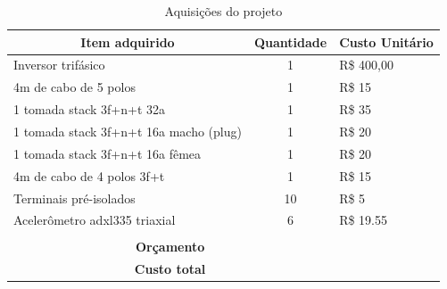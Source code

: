 \begin{table}[H]
\centering
\caption{Aquisições do projeto}
\label{tab:acompanhamento_custos}
\begin{tabular}{|l|c|l|}
\hline
\multicolumn{1}{|c|}{\textbf{Item adquirido}} & \textbf{Quantidade} & \multicolumn{1}{c|}{\textbf{Custo Unitário}} \\ \hline
Inversor trifásico                            & 1                   & R\$ 400,00                                   \\ \hline
4m de cabo de 5 polos                         & 1                   & R\$ 15                                       \\ \hline
1 tomada stack 3f+n+t 32a                     & 1                   & R\$ 35                                       \\ \hline
1 tomada stack 3f+n+t 16a macho (plug)        & 1                   & R\$ 20                                       \\ \hline
1 tomada stack 3f+n+t 16a fêmea               & 1                   & R\$ 20                                       \\ \hline
4m de cabo de 4 polos 3f+t                    & 1                   & R\$ 15                                       \\ \hline
Terminais pré-isolados                        & 10                  & R\$ 5                                        \\ \hline
Acelerômetro adxl335 triaxial                 & 6                   & R\$ 19.55                                    \\ \hline
                                              &                     &                                              \\ \hline
\multicolumn{2}{|c|}{\textbf{Orçamento}}                            &                                              \\ \hline
\multicolumn{2}{|c|}{\textbf{Custo total}}                          &                                              \\ \hline
\end{tabular}
\end{table}

